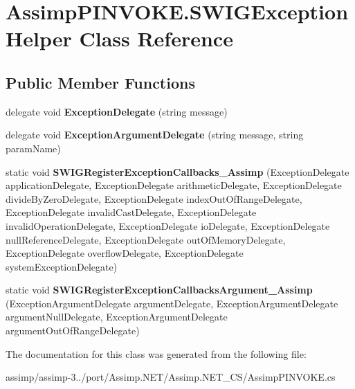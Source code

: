 \hypertarget{class_assimp_p_i_n_v_o_k_e_1_1_s_w_i_g_exception_helper}{\section{Assimp\+P\+I\+N\+V\+O\+K\+E.\+S\+W\+I\+G\+Exception\+Helper Class Reference}
\label{class_assimp_p_i_n_v_o_k_e_1_1_s_w_i_g_exception_helper}
}
\subsection*{Public Member Functions}
\begin{DoxyCompactItemize}
\item 
\hypertarget{class_assimp_p_i_n_v_o_k_e_1_1_s_w_i_g_exception_helper_a9b9ea6124531157d767127fc13016130}{delegate void {\bfseries Exception\+Delegate} (string message)}\label{class_assimp_p_i_n_v_o_k_e_1_1_s_w_i_g_exception_helper_a9b9ea6124531157d767127fc13016130}

\item 
\hypertarget{class_assimp_p_i_n_v_o_k_e_1_1_s_w_i_g_exception_helper_a90a401d9e11b8505641b3580719e7cba}{delegate void {\bfseries Exception\+Argument\+Delegate} (string message, string param\+Name)}\label{class_assimp_p_i_n_v_o_k_e_1_1_s_w_i_g_exception_helper_a90a401d9e11b8505641b3580719e7cba}

\item 
\hypertarget{class_assimp_p_i_n_v_o_k_e_1_1_s_w_i_g_exception_helper_aeeed7ec8a2c7f25d3e989c786a2d9cd5}{static void {\bfseries S\+W\+I\+G\+Register\+Exception\+Callbacks\+\_\+\+Assimp} (Exception\+Delegate application\+Delegate, Exception\+Delegate arithmetic\+Delegate, Exception\+Delegate divide\+By\+Zero\+Delegate, Exception\+Delegate index\+Out\+Of\+Range\+Delegate, Exception\+Delegate invalid\+Cast\+Delegate, Exception\+Delegate invalid\+Operation\+Delegate, Exception\+Delegate io\+Delegate, Exception\+Delegate null\+Reference\+Delegate, Exception\+Delegate out\+Of\+Memory\+Delegate, Exception\+Delegate overflow\+Delegate, Exception\+Delegate system\+Exception\+Delegate)}\label{class_assimp_p_i_n_v_o_k_e_1_1_s_w_i_g_exception_helper_aeeed7ec8a2c7f25d3e989c786a2d9cd5}

\item 
\hypertarget{class_assimp_p_i_n_v_o_k_e_1_1_s_w_i_g_exception_helper_ab7560aac5b22daab4a8530644679ce45}{static void {\bfseries S\+W\+I\+G\+Register\+Exception\+Callbacks\+Argument\+\_\+\+Assimp} (Exception\+Argument\+Delegate argument\+Delegate, Exception\+Argument\+Delegate argument\+Null\+Delegate, Exception\+Argument\+Delegate argument\+Out\+Of\+Range\+Delegate)}\label{class_assimp_p_i_n_v_o_k_e_1_1_s_w_i_g_exception_helper_ab7560aac5b22daab4a8530644679ce45}

\end{DoxyCompactItemize}


The documentation for this class was generated from the following file\+:\begin{DoxyCompactItemize}
\item 
assimp/assimp-\/3../port/\+Assimp.\+N\+E\+T/\+Assimp.\+N\+E\+T\+\_\+\+C\+S/Assimp\+P\+I\+N\+V\+O\+K\+E.\+cs\end{DoxyCompactItemize}
